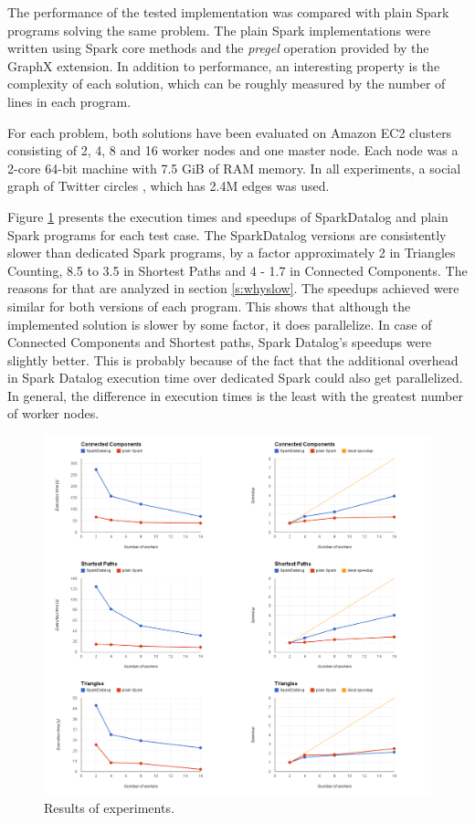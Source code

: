 The performance of the tested implementation was compared with plain Spark programs solving the same problem. The plain Spark implementations were written using Spark core methods and the \emph{pregel} operation provided by the GraphX extension. In addition to performance, an interesting property is the complexity of each solution, which can be roughly measured by the number of lines in each program.

For each problem, both solutions have been evaluated on Amazon EC2 clusters consisting of 2, 4, 8 and 16 worker nodes and one master node. Each node was a 2-core 64-bit machine with 7.5 GiB of RAM memory.  In all experiments, a social graph of Twitter circles \cite{twitterdata}, which has 2.4M edges was used.

Figure \ref{img_plots_exp} presents the execution times and speedups of SparkDatalog and plain Spark programs for each test case. The SparkDatalog versions are consistently slower than dedicated Spark programs, by a factor approximately 2 in Triangles Counting, 8.5 to 3.5 in Shortest Paths and 4 - 1.7 in Connected Components. The reasons for that are analyzed in section \ref{s:whyslow}. The speedups achieved were similar for both versions of each program. This shows that although the implemented solution is slower by some factor, it does parallelize. In case of Connected Components and Shortest paths, Spark Datalog's speedups were slightly better. This is probably because of the fact that the additional overhead in Spark Datalog execution time over dedicated Spark could also get parallelized. In general, the difference in execution times is the least with the greatest number of worker nodes.

\begin{figure}[!htbp]
  \centering
    \includegraphics[width=\textwidth]{images/plots_all.png}
   \caption{Results of experiments. \label{img_plots_exp}}
\end{figure}


